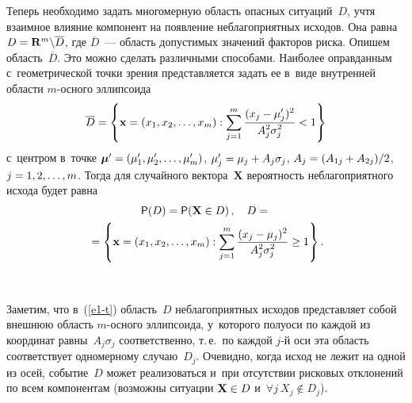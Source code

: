 \begin{multicols}{2}
  Теперь необходимо задать многомерную область опас\-ных ситуаций~$D$, 
учтя взаимное вли\-яние компонент на по\-яв\-ле\-ние неблагоприятных исходов. Она 
равна $D\hm= \mathbf{R}^m\backslash \overline{D}$, где $\overline{D}$~--- 
об\-ласть допустимых значений фак\-то\-ров рис\-ка. Опишем 
об\-ласть~$\overline{D}$. Это можно сделать различными способами. Наиболее 
оправданным с~гео\-мет\-ри\-че\-ской точки зрения пред\-став\-ля\-ет\-ся задать ее в~виде 
внут\-рен\-ней об\-ласти $m$-ос\-но\-го эллипсоида
  $$
  \overline{D}= \left\{ \mathbf{x}=\left( x_1, x_2, \ldots , x_m\right): 
\sum\limits_{j=1}^m \displaystyle\frac{\displaystyle (x_j-\mu_j^\prime)^2\mathstrut}{\displaystyle A^2_j \sigma_j^2\mathstrut}<1\right\}
  $$
с~центром в~точке $\boldsymbol{\mu}^\prime \hm= (\mu_1^\prime, \mu_2^\prime, 
\ldots , \mu_m^\prime)$, $\mu_j^\prime\hm= \mu_j\hm+A_j\sigma_j$, 
$A_j\hm=(A_{1j}\hm+ A_{2j})/2$, $j\hm=1, 2,\ldots, m$. Тогда для случайного 
вектора~$\mathbf{X}$ ве\-ро\-ят\-ность неблагоприятного исхода будет равна
\begin{multline}
{\sf P}(D) ={\sf P}(\mathbf{X}\in D)\,,\quad
D={}\\
\!\!{}=\left\{ \mathbf{x}=\left( x_1, x_2, \ldots ,x_m\right): \sum\limits^m_{j=1} 
\displaystyle\frac{\displaystyle (x_j-\mu_j)^2\mathstrut}{\displaystyle A_j^2\sigma_j^2\mathstrut}\geq 1\right\}.\!\!
\label{e1-t}
\end{multline}

\begin{figure*}[b] %
     \vspace*{1pt}
 \begin{center}
 \mbox{%
 \epsfxsize=162.957mm 
 }
 \end{center}
\vspace*{-9pt}
\end{figure*}
  
  Заметим, что в~(\ref{e1-t}) об\-ласть~$D$ неблагоприятных исходов 
пред\-став\-ля\-ет собой внешнюю об\-ласть \mbox{$m$-ос}\-но\-го эл\-лип\-со\-ида, у~которого 
полуоси по каж\-дой из координат равны~$A_j\sigma_j$ соответственно, т.\,е.\ по 
каж\-дой $j$-й оси эта об\-ласть соответствует одномерному случаю~$D_j$. 
Очевидно, когда исход не лежит на одной из осей, событие~$D$ может 
реализоваться и~при отсутствии рис\-ко\-вых отклонений по всем компонентам 
(воз\-мож\-ны ситуации $\mathbf{X}\hm\in D$ и~$\forall j\ X_j\notin D_j$).
  

\end{multicols}
